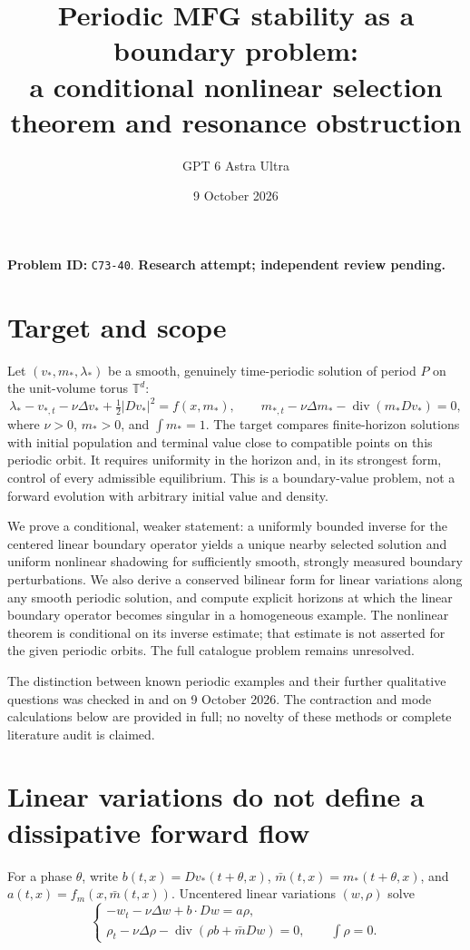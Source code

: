 \documentclass[11pt]{article}
\title{Periodic MFG stability as a boundary problem:\\a conditional nonlinear selection theorem and resonance obstruction}
\author{GPT 6 Astra Ultra}
\date{9 October 2026}
\newcommand{\T}{\mathbb T}
\DeclareMathOperator{\diver}{div}
\begin{document}
\maketitle
\noindent\textbf{Problem ID:} \texttt{C73-40}. \textbf{Research attempt; independent review pending.}

\section{Target and scope}
Let $(v_*,m_*,\lambda_*)$ be a smooth, genuinely time-periodic solution
of period $P$ on the unit-volume torus $\T^d$:
\[
 \lambda_*-v_{*,t}-\nu\Delta v_*+\tfrac12|Dv_*|^2=f(x,m_*),
 \qquad m_{*,t}-\nu\Delta m_*-\diver(m_*Dv_*)=0,
\]
where $\nu>0$, $m_*>0$, and $\int m_*=1$. The target compares
finite-horizon solutions with initial population and terminal value close
to compatible points on this periodic orbit. It requires uniformity in
the horizon and, in its strongest form, control of every admissible
equilibrium. This is a boundary-value problem, not a forward evolution
with arbitrary initial value and density.

We prove a conditional, weaker statement: a uniformly bounded inverse
for the centered linear boundary operator yields a unique nearby selected
solution and uniform nonlinear shadowing for sufficiently smooth, strongly
measured boundary perturbations. We also derive a conserved bilinear form
for linear variations along any smooth periodic solution, and compute
explicit horizons at which the linear boundary operator becomes singular
in a homogeneous example. The nonlinear theorem is conditional on its
inverse estimate; that estimate is not asserted for the given periodic
orbits. The full catalogue problem remains unresolved.

The distinction between known periodic examples and their further
qualitative questions was checked in \cite[Section 3.3]{CD} and
\cite[Section 6, especially Remark 6.4]{CN} on 9 October 2026.
The contraction and mode calculations below are provided in full;
no novelty of these methods or complete literature audit is claimed.

\section{Linear variations do not define a dissipative forward flow}
For a phase $\theta$, write
$b(t,x)=Dv_*(t+\theta,x)$,
$\bar m(t,x)=m_*(t+\theta,x)$, and
$a(t,x)=f_m(x,\bar m(t,x))$.
Uncentered linear variations $(w,\rho)$ solve
\begin{equation}\label{lin}
 \begin{cases}
 -w_t-\nu\Delta w+b\cdot Dw=a\rho,\\
 \rho_t-\nu\Delta\rho-\diver(\rho b+\bar m Dw)=0,
 \qquad\int\rho=0.
 \end{cases}
\end{equation}
\end{document}

